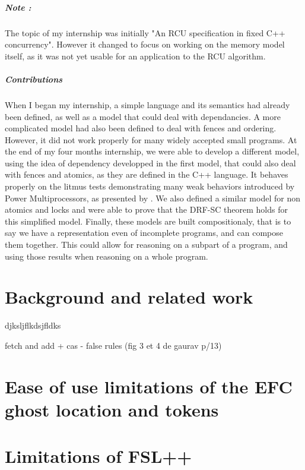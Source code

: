 \documentclass[titlepage,11pt,a4paper]{report}
\theoremstyle{plain}
\begin{document}
\paragraph{Note :} The topic of my internship was initially "An RCU specification in fixed C++ concurrency". However it changed to focus on working on the memory model itself, as it was not yet usable for an application to the RCU algorithm.

\paragraph{Contributions}
When I began my internship, a simple language and its semantics had already been defined, as well as a model that could deal with dependancies. A more complicated model had also been defined to deal with fences and ordering. However, it did not work properly for many widely accepted small programs.
At the end of my four months internship, we were able to develop a different model, using the idea of dependency developped in the first model, that could also deal with fences and atomics, as they are defined in the C++ language. It behaves properly on the litmus tests demonstrating many weak behaviors introduced by Power Multiprocessors, as presented by \cite{powerMultiProc}. We also defined a similar model for non atomics and locks and were able to prove that the DRF-SC theorem holds for this simplified model.
Finally, these models are built compositionaly, that is to say we have a representation even of incomplete programs, and can compose them together. This could allow for reasoning on a subpart of a program, and using those results when reasoning on a whole program.


\chapter{Background and related work}
djksljflkdsjfldks

fetch and add  + cas - false rules (fig 3 et 4 de gaurav p/13)

\chapter{Ease of use limitations of the EFC ghost location and tokens}



\chapter{Limitations of FSL++}


\end{document}
